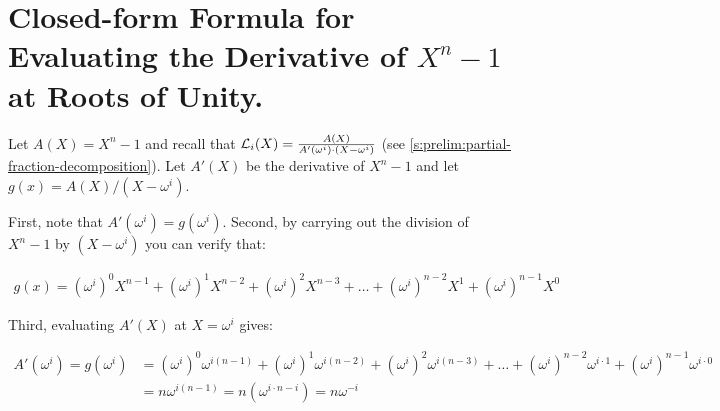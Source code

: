 \section{Closed-form Formula for Evaluating the Derivative of $X^n - 1$ at Roots of Unity.}
\label{app:xn-1-derivative}

Let $A(X)=X^n - 1$ and recall that $\mathcal{L}_i(X) = \frac{A(X)}{A'(\omega^i)\cdot(X-\omega^i)}$ (see \cref{s:prelim:partial-fraction-decomposition}).
Let $A'(X)$ be the derivative of $X^n - 1$ and let $g(x)=A(X)/(X-\omega^i)$.

First, note that $A'(\omega^i)=g(\omega^i)$.
Second, by carrying out the division of $X^n -1$ by $(X-\omega^i)$ you can verify that:

\begin{align}
g(x) = (\omega^i)^0 X^{n-1} + (\omega^i)^1 X^{n-2} + (\omega^i)^2 X^{n-3} + \dots + (\omega^i)^{n-2} X^1 + (\omega^i)^{n-1} X^0
\end{align}

Third, evaluating $A'(X)$ at $X=\omega^i$ gives:

\begin{align}
A'(\omega^i) = g(\omega^i) &= (\omega^i)^0 \omega^{i(n-1)} + (\omega^i)^1 \omega^{i(n-2)} + (\omega^i)^2 \omega^{i(n-3)} + \dots + (\omega^i)^{n-2} \omega^{i\cdot1} + (\omega^i)^{n-1} \omega^{i\cdot0}\\
&= n\omega^{i(n-1)} = n(\omega^{i\cdot n-i})=n\omega^{-i}
\end{align}








